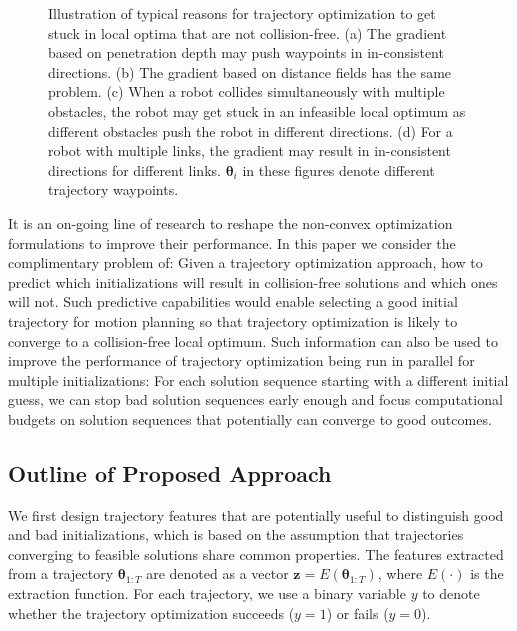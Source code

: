 \documentclass[letterpaper, 10 pt, conference]{ieeeconf}  %
\newcommand{\btheta}{\mbox{$\bm \theta$}}
\newcommand{\fsym}{\mbox{$\mathbf z$}}
\begin{document}
\begin{figure}[t]
\caption{Illustration of typical reasons for trajectory optimization to get stuck in local optima that are not collision-free. (a) The gradient based on penetration depth may push waypoints in in-consistent directions. (b) The gradient based on distance fields has the same problem. (c) When a robot collides simultaneously with multiple obstacles, the robot may get stuck in an infeasible local optimum as different obstacles push the robot in different directions. (d) For a robot with multiple links, the gradient may result in in-consistent directions for different links. $\btheta_i$ in these figures denote different trajectory waypoints.}
\label{fig:badgradient}
\end{figure}

It is an on-going line of research to reshape the non-convex optimization formulations to improve their performance.  In this paper we consider the complimentary problem of: Given a trajectory optimization approach, how to predict which initializations will result in collision-free solutions and which ones will not. Such predictive capabilities would enable selecting a good initial trajectory for motion planning so that trajectory optimization is likely to converge to a collision-free local optimum. Such information can also be used to improve the performance of trajectory optimization being run in parallel for multiple initializations: For each solution sequence starting with a different initial guess, we can stop bad solution sequences early enough and focus computational budgets on solution sequences that potentially can converge to good outcomes.

\subsection{Outline of Proposed Approach}
We first design trajectory features that are potentially useful to distinguish good and bad initializations, which is based on the assumption that trajectories converging to feasible solutions share common properties. The features extracted from a trajectory $\btheta_{1:T}$ are denoted as a vector $\fsym = E(\btheta_{1:T})$, where $E(\cdot)$ is the extraction function. For each trajectory, we use a binary variable $y$ to denote whether the trajectory optimization succeeds ($y = 1$) or fails ($y = 0$).
\end{document}
